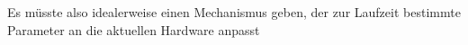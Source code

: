  Es müsste also idealerweise einen Mechanismus geben, der zur Laufzeit bestimmte Parameter an die aktuellen Hardware anpasst



